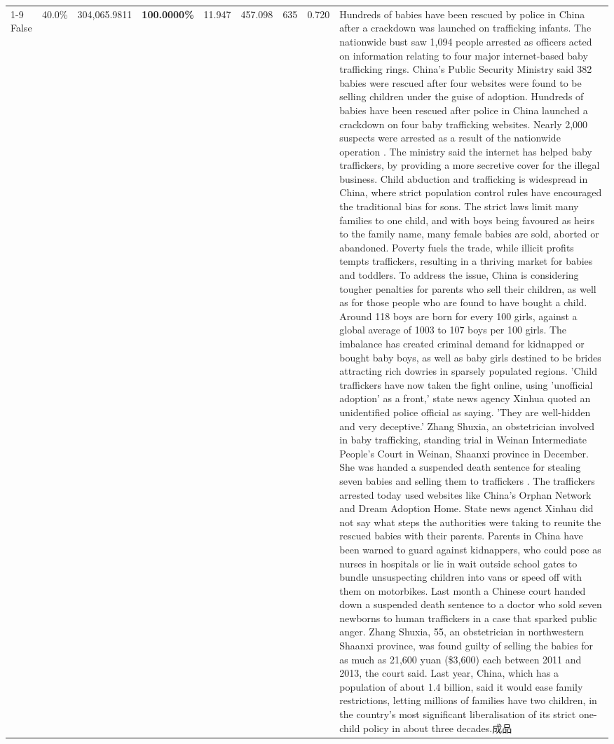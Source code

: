 \begin{table}[H]
\begin{tabular}{lllrlllll}
\cline{1-9}
False & 40.0\% & 304,065.9811 & \bfseries \color{red} 100.0000\% & 11.947 & 457.098 & 635 & 0.720 & Hundreds of babies have been rescued by police in China after a crackdown was launched on trafficking infants. The nationwide bust saw 1,094 people arrested as officers acted on information relating to four major internet-based baby trafficking rings. China's Public Security Ministry said 382 babies were rescued after four websites were found to be selling children under the guise of adoption. Hundreds of babies have been rescued after police in China launched a crackdown on four baby trafficking websites. Nearly 2,000 suspects were arrested as a result of the nationwide operation . The ministry said the internet has helped baby traffickers, by providing a more secretive cover for the illegal business. Child abduction and trafficking is widespread in China, where strict population control rules have encouraged the traditional bias for sons. The strict laws limit many families to one child, and with boys being favoured as heirs to the family name, many female babies are sold, aborted or abandoned. Poverty fuels the trade, while illicit profits tempts traffickers, resulting in a thriving market for babies and toddlers. To address the issue, China is considering tougher penalties for parents who sell their children, as well as for those people who are found to have bought a child. Around 118 boys are born for every 100 girls, against a global average of 1003 to 107 boys per 100 girls. The imbalance has created criminal demand for kidnapped or bought baby boys, as well as baby girls destined to be brides attracting rich dowries in sparsely populated regions. 'Child traffickers have now taken the fight online, using 'unofficial adoption' as a front,' state news agency Xinhua quoted an unidentified police official as saying. 'They are well-hidden and very deceptive.' Zhang Shuxia, an obstetrician involved in baby trafficking, standing trial in Weinan Intermediate People's Court in Weinan, Shaanxi province in December. She was handed a suspended death sentence for stealing seven babies and selling them to traffickers . The traffickers arrested today used websites like China's Orphan Network and Dream Adoption Home. State news agenct Xinhau did not say what steps the authorities were taking to reunite the rescued babies with their parents. Parents in China have been warned to guard against kidnappers, who could pose as nurses in hospitals or lie in wait outside school gates to bundle unsuspecting children into vans or speed off with them on motorbikes. Last month a Chinese court handed down a suspended death sentence to a doctor who sold seven newborns to human traffickers in a case that sparked public anger. Zhang Shuxia, 55, an obstetrician in northwestern Shaanxi province, was found guilty of selling the babies for as much as 21,600 yuan (\$3,600) each between 2011 and 2013, the court said. Last year, China, which has a population of about 1.4 billion, said it would ease family restrictions, letting millions of families have two children, in the country's most significant liberalisation of its strict one-child policy in about three decades.成品 \\

\end{tabular}
\end{table}
